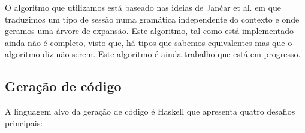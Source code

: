 O algoritmo que utilizamos está baseado nas ideias de Jančar et al. \cite{bisimilarity} em que traduzimos um tipo de sessão numa gramática independente do contexto e onde geramos uma árvore de expansão. Este algoritmo, tal como está implementado ainda não é completo, visto que, há tipos que sabemos equivalentes mas que o algoritmo diz não serem. Este algoritmo é ainda trabalho que está em progresso.


\subsection{Geração de código}
A linguagem alvo da geração de código é Haskell que apresenta quatro desafios principais:

